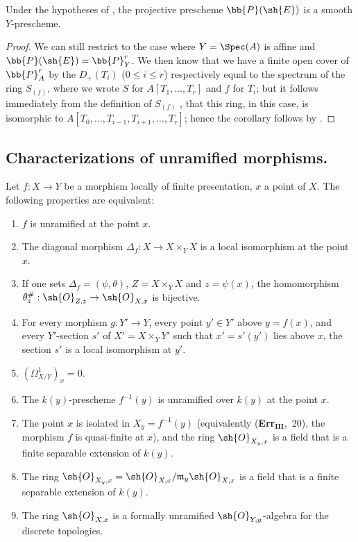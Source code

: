 \begin{corollary}[17.3.9]
\label{IV.17.3.9}
Under the hypotheses of , the projective prescheme $\bb{P}(\sh{E})$  is a smooth $Y$-prescheme.
\end{corollary}

\begin{proof}
We can still restrict to the case where $Y=\Spec(A)$ is affine and $\bb{P}(\sh{E})=\bb{P}_Y^r$.
We then know  that we have a finite open cover of $\bb{P}^r_{A}$ by the $D_+(T_i)$ ($0\leq i\leq r$) respectively equal to the spectrum of the ring $S_{(f)}$, where we wrote $S$ for $A[T_1,\dots,T_r]$ and $f$ for $T_i$;
but it follows immediately from the definition of $S_{(f)}$ , that this ring, in this case, is isomorphic to $A[T_0,\dots,T_{i-1},T_{i+1},\dots,T_r]$;
hence the corollary follows by .
\end{proof}

\subsection{Characterizations of unramified morphisms.}
\label{subsection:IV.17.4}


\begin{theorem}[17.4.1]
\label{IV.17.4.1}
Let $f:X\to Y$ be a morphism locally of finite presentation, $x$ a point of $X$.
The following properties are equivalent:
\begin{enumerate}[label=(\alph*)]
  \item $f$ is unramified at the point $x$.
  \item The diagonal morphism $\Delta_f:X\to X\times_Y X$ is a local isomorphism at the point $x$.
  \item[b')] If one sets $\Delta_f=(\psi,\theta)$, $Z=X\times_Y X$ and $z=\psi(x)$, the homomorphism $\theta_z^\#:\sh{O}_{Z,z}\to\sh{O}_{X,x}$ is bijective.
  \item[b'')] For every morphism $g:Y'\to Y$, every point $y'\in Y'$ above $y=f(x)$, and every $Y'$-section $s'$ of $X'=X\times_Y Y'$ such that $x'=s'(y')$ lies above $x$, the section $s'$ is a local isomorphism at $y'$.
  \item $(\Omega^1_{X/Y})_x=0$.
  \item The $k(y)$-prescheme $f^{-1}(y)$ is unramified over $k(y)$ at the point $x$.
  \item[d')] The point $x$ is isolated in $X_y=f^{-1}(y)$ (equivalently (\textbf{Err}$_\textbf{III}$,~20), the morphism $f$ is quasi-finite at $x$), and the ring $\sh{O}_{X_y,x}$ is a field that is a finite separable extension of $k(y)$.
  \item[d'')] The ring $\sh{O}_{X_y,x}=\sh{O}_{X,x}/\mathfrak{m}_y\sh{O}_{X,x}$ is a field that is a finite separable extension of $k(y)$.
  \item The ring $\sh{O}_{X,x}$ is a formally unramified $\sh{O}_{Y,y}$-algebra for the discrete topologies.
\end{enumerate}
\end{theorem}

